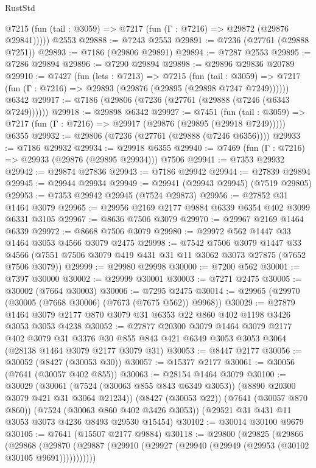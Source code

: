 \begin{lexlean}{RustStd}
\begin{coremodule}
{\begin{coremodule}
{{{{{{{{{{{{{{{{{{{{{{{{{{{{{{{{      @7215 (fun (tail : @3059) => @7217 (fun (Γ : @7216) => @29872 (@29876 @29841)))))
    @2553
@29888 := @7243 @2553
@29891 := @7236 (@27761 (@29888 @7251))
@29893 := @7186 (@29806 @29891)
@29894 := @7287 @2553
@29895 := @7286 @29894
@29896 := @7290 @29894
@29898 := @29896 @29836 @20789
@29910 := @7427
    (fun (lets : @7213) =>
    @7215
      (fun (tail : @3059) =>
      @7217 (fun (Γ : @7216) => @29893 (@29876 (@29895 (@29898 @7247 @7249))))))
    @6342
@29917 := @7186 (@29806 (@7236 (@27761 (@29888 (@7246 (@6343 @7249))))))
@29918 := @29898 @6342
@29927 := @7451
    (fun (tail : @3059) => @7217 (fun (Γ : @7216) => @29917 (@29876 (@29895 (@29918 @7249)))))
    @6355
@29932 := @29806 (@7236 (@27761 (@29888 (@7246 @6356))))
@29933 := @7186 @29932
@29934 := @29918 @6355
@29940 := @7469 (fun (Γ : @7216) => @29933 (@29876 (@29895 @29934))) @7506
@29941 := @7353 @29932
@29942 := @29874 @27836
@29943 := @7186 @29942
@29944 := @27839 @29894
@29945 := @29944 @29934
@29949 := @29941 (@29943 @29945) (@7519 @29805)
@29953 := @7353 @29942 @29945 (@7524 @29873)
@29956 := @27852 @31 @1464 @3079
@29965 := @29956 @2169 @2177 @9884 @6339 @6354 @402 @3099 @6331 @3105
@29967 := @8636 @7506 @3079
@29970 := @29967 @2169 @1464 @6339
@29972 := @8668 @7506 @3079
@29980 := @29972 @562 @1447 @33 @1464 @3053 @4566 @3079 @2475
@29998 := @7542
    @7506
    @3079
    @1447
    @33
    @4566
    (@7551 @7506 @3079 @419 @431 @31 @11 @3062 @3073 @27875 (@7652 @7506 @3079))
@29999 := @29980 @29998
@30000 := @7200 @562
@30001 := @7397 @30000
@30002 := @29999 @30001
@30003 := @7271 @2475
@30005 := @30002 (@7664 @30003)
@30006 := @7295 @2475
@30014 := @29965 (@29970 (@30005 (@7668 @30006) (@7673 (@7675 @562)) @9968))
@30029 := @27879 @1464 @3079 @2177 @870 @3079 @31 @6353 @22 @860 @402 @1198 @3426 @3053 @3053 @4238
@30052 := @27877
    @20300
    @3079
    @1464
    @3079
    @2177
    @402
    @3079
    @31
    @3376
    @30
    @855
    @843
    @421
    @6349
    @3053
    @3053
    @3064
    (@28138 @1464 @3079 @2177 @3079 @31)
@30053 := @8447 @2177
@30056 := @30052 (@8427 (@30053 @30))
@30057 := @15377 @2177
@30061 := @30056 (@7641 (@30057 @402 @855))
@30063 := @28154 @1464 @3079
@30100 := @30029
    (@30061 (@7524 (@30063 @855 @843 @6349 @3053)) (@8890 @20300 @3079 @421 @31 @3064 @21234))
    (@8427 (@30053 @22))
    (@7641 (@30057 @870 @860))
    (@7524 (@30063 @860 @402 @3426 @3053))
    (@29521 @31 @431 @11 @3053 @3073 @4236 @8493 @29530 @15454)
@30102 := @30014 @30100 @9679
@30105 := @7641 (@15507 @2177 @9884)
@30118 := @29800
    (@29825
      (@29866
        (@29868
          (@29870 (@29887 (@29910 (@29927 (@29940 (@29949 (@29953 (@30102 @30105 @9691)))))))))))
}}}}}}}}}}}}}}}}}}}}}}}}}}}}}}}}
\end{coremodule}}
\end{coremodule}
\end{lexlean}

